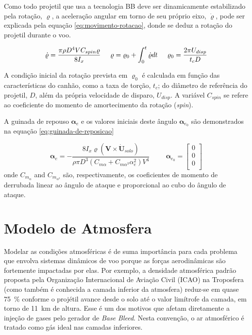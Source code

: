 Como todo projetil que usa a tecnologia BB deve ser dinamicamente estabilizado pela rotação, \(\varrho\), a aceleração angular em torno de seu próprio eixo, \(\dot{\varrho}\), pode ser explicada pela equação \ref{eq:movimento-rotacao}, donde se deduz a rotação do projetil durante o voo.

\begin{equation}
    \label{eq:movimento-rotacao}
    \dot{\varrho} = \frac{\pi\rho D^{4}VC_{spin}\varrho}{8I_{x}} 
    \hspace{0.5cm}
    \varrho = \varrho_{0} + \int_{0}^{t}\dot{\varrho}dt 
    \hspace{0.5cm}
    \varrho_{0} = \frac{2\pi U_{disp}}{t_{c}D} 
\end{equation}

A condição inicial da rotação prevista em \(\varrho_{0}\) é calculada em função das características do canhão, como a taxa de torção, \(t_c\); do diâmetro de referência do projetil, \(D\), além da própria velocidade de disparo, \(U_{disp}\). A variável \(C_{spin}\) se refere ao coeficiente do momento de amortecimento da rotação (\textit{spin}).

A guinada de repouso \(\boldsymbol{\alpha}_{e}\) e os valores iniciais deste ângulo \(\boldsymbol{\alpha}_{e_{0}}\) são demonstrados na equação \ref{eq:guinada-de-reposicao}

\begin{equation}
	\label{eq:guinada-de-reposicao}
	 \boldsymbol{\alpha}_{e} = -\frac{8I_{x}\varrho(\boldsymbol{V}\times\dot{\boldsymbol{U}}_{solo})}{\rho\pi D^{3}(C_{m\alpha} + C_{m\alpha^{3}}\alpha_{e}^2)V^{4}}
	 \hspace{1cm}
	 \boldsymbol{\alpha}_{e_{0}} =
    \begin{bmatrix} 
        0 \\
        0 \\
        0 \\
    \end{bmatrix}
\end{equation}
%
onde \(C_{m_{\alpha}}\) and \(C_{m_{\alpha^3}}\) são, respectivamente, os coeficientes de momento de derrubada linear ao ângulo de ataque e proporcional ao cubo do ângulo de ataque.

\section{Modelo de Atmosfera}
\label{sec:ICAOatm}

Modelar as condições atmosféricas é de suma importância para cada problema que envolva sistemas dinâmicos de voo porque as forças aerodinâmicas são fortemente impactadas por elas. Por exemplo, a densidade atmosférica padrão proposta pela Organização Internacional de Aviação Civil (ICAO) \cite{international1993manual} na Troposfera (como também é conhecida a camada inferior da atmosfera) reduz-se em quase \qty{75}{\percent} conforme o projétil avance desde o solo até o valor limítrofe da camada, em torno de \qty{11}{\kilo\metre} de altura. Esse é um dos motivos que afetam diretamente a injeção de gases pelo gerador de \textit{Base Bleed}. Nesta convenção, o ar atmosférico é tratado como gás ideal nas camadas inferiores. 

